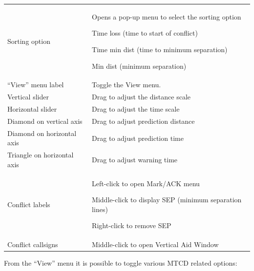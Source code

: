 \documentclass[a4paper,oneside,11pt]{memoir}
\begin{document}
\begin{longtable}{p{5.5cm} p{7cm}}
  Sorting option              & Opens a pop-up menu to select the sorting option
                                  
                                Time loss (time to start of conflict)

                                Time min dist (time to minimum separation)

                                Min dist (minimum separation)\\
  “View” menu label           & Toggle the View menu.\\
  Vertical slider             & Drag to adjust the distance scale\\
  Horizontal slider           & Drag to adjust the time scale\\
  Diamond on vertical axis    & Drag to adjust prediction distance    \\
  Diamond on horizontal axis  & Drag to adjust prediction time\\
  Triangle on horizontal axis & Drag to adjust warning time\\
  Conflict labels             & Left-click to open Mark/ACK menu

                                Middle-click to display SEP (minimum separation lines)  

                                Right-click to remove SEP\\
  Conflict callsigns          & Middle-click to open Vertical Aid Window\\
\end{longtable}

From the “View” menu it is possible to toggle various MTCD related options:
\end{document}
